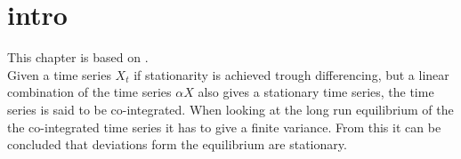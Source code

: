\chapter{intro}
This chapter is based on \cite{co-Integration_and_error_correction}.
\\
Given a time series $X_t$ if stationarity is achieved trough differencing, but a linear combination of the time series $\alpha X$ also gives a stationary time series, the time series is said to be co-integrated. When looking at the long run equilibrium of the the co-integrated time series it has to give a finite variance. From this it can be concluded that deviations form the equilibrium are stationary.
